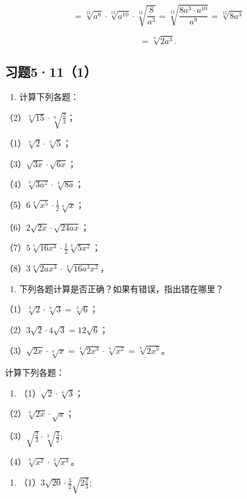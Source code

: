\[
= \sqrt[12]{a ^ {6}} \cdot \sqrt[12]{a ^ {10}} \cdot \sqrt[12]{\frac{8}{a ^ {3}}} = \sqrt[12]{\frac{8 a ^ {3} \cdot a ^ {10}}{a ^ {9}}} = \sqrt[12]{8 a ^ {3}}
\]

\[
= \sqrt[4]{2 a ^ {3}}.
\]

\subsection{习题5·11（1）}

\begin{enumerate}
\item
  计算下列各题：
\end{enumerate}

（2）\(\sqrt[3]{15} \cdot \sqrt[9]{\frac{2}{3}}\)；

（1）\(\sqrt[3]{2} \cdot \sqrt[3]{5}\)；

（3）\(\sqrt{3x} \cdot \sqrt{6x}\)；

（4）\(\sqrt[3]{3a^2} \cdot \sqrt[3]{8a}\)；

（5）\(6\sqrt[4]{x^5} \cdot \frac{1}{2}\sqrt[4]{x}\)；

（6）\(2\sqrt{2x} \cdot \sqrt{24ax}\)；

（7）\(5\sqrt[5]{16x^3} \cdot \frac{1}{2}\sqrt[3]{5x^2}\)；

（8）\(3\sqrt[4]{2ax^3} \cdot \sqrt[4]{16a^3x^2}\)，

\begin{enumerate}[start=2]
\item
  下列各题计算是否正确？如果有错误，指出错在哪里？
\end{enumerate}

（1）\(\sqrt[3]{2} \cdot \sqrt[3]{3} = \sqrt[3]{6}\)；

（2）\(3\sqrt{2} \cdot 4\sqrt{3} = 12\sqrt{6}\)；

（3）\(\sqrt{2x} \cdot \sqrt[4]{x} = \sqrt[4]{2x^3} \cdot \sqrt[4]{x^2} = \sqrt[4]{2x^5}\)。

计算下列各题：

\begin{enumerate}[start=3]
\item
  （1）\(\sqrt{2} \cdot \sqrt[4]{3}\)；
\end{enumerate}

（2）\(\sqrt[3]{2x} \cdot \sqrt{x}\)；

（3）\(\sqrt{\frac{2}{3}} \cdot \sqrt[3]{\frac{3}{2}};\)

（4）\(\sqrt[3]{x^2} \cdot \sqrt[3]{x^3}\)。

\begin{enumerate}[start=4]
\item
  （1）\(3\sqrt{20} \cdot \frac{3}{2}\sqrt{2\frac{2}{3}};\)
\end{enumerate}

